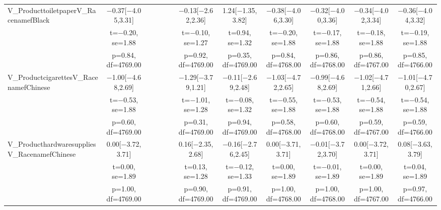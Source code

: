 \documentclass[]{report}
\begin{document}
\begin{table}
{\begin{tabular}[t]{lccccccccccc}
		V\_ProducttoiletpaperV\_RacenamefBlack & \num{-0.37}[\num{-4.05},\num{3.31}] &  &  &  &  & \num{-0.13}[\num{-2.62},\num{2.36}] & \num{1.24}[\num{-1.35},\num{3.82}] & \num{-0.38}[\num{-4.06},\num{3.30}] & \num{-0.32}[\num{-4.00},\num{3.36}] & \num{-0.34}[\num{-4.02},\num{3.34}] & \num{-0.36}[\num{-4.04},\num{3.32}]\\
		& t=\num{-0.20}, se=\num{1.88} &  &  &  &  & t=\num{-0.10}, se=\num{1.27} & t=\num{0.94}, se=\num{1.32} & t=\num{-0.20}, se=\num{1.88} & t=\num{-0.17}, se=\num{1.88} & t=\num{-0.18}, se=\num{1.88} & t=\num{-0.19}, se=\num{1.88}\\
		& p=\num{0.84}, df=\num{4769.00} &  &  &  &  & p=\num{0.92}, df=\num{4769.00} & p=\num{0.35}, df=\num{4769.00} & p=\num{0.84}, df=\num{4768.00} & p=\num{0.86}, df=\num{4768.00} & p=\num{0.86}, df=\num{4767.00} & p=\num{0.85}, df=\num{4766.00}\\
		V\_ProductcigarettesV\_RacenamefChinese & \num{-1.00}[\num{-4.68},\num{2.69}] &  &  &  &  & \num{-1.29}[\num{-3.79},\num{1.21}] & \num{-0.11}[\num{-2.69},\num{2.48}] & \num{-1.03}[\num{-4.72},\num{2.65}] & \num{-0.99}[\num{-4.68},\num{2.69}] & \num{-1.02}[\num{-4.71},\num{2.66}] & \num{-1.01}[\num{-4.70},\num{2.67}]\\
		& t=\num{-0.53}, se=\num{1.88} &  &  &  &  & t=\num{-1.01}, se=\num{1.28} & t=\num{-0.08}, se=\num{1.32} & t=\num{-0.55}, se=\num{1.88} & t=\num{-0.53}, se=\num{1.88} & t=\num{-0.54}, se=\num{1.88} & t=\num{-0.54}, se=\num{1.88}\\
		& p=\num{0.60}, df=\num{4769.00} &  &  &  &  & p=\num{0.31}, df=\num{4769.00} & p=\num{0.94}, df=\num{4769.00} & p=\num{0.58}, df=\num{4768.00} & p=\num{0.60}, df=\num{4768.00} & p=\num{0.59}, df=\num{4767.00} & p=\num{0.59}, df=\num{4766.00}\\
		V\_ProducthardwaresuppliesV\_RacenamefChinese & \num{0.00}[\num{-3.72},\num{3.71}] &  &  &  &  & \num{0.16}[\num{-2.35},\num{2.68}] & \num{-0.16}[\num{-2.76},\num{2.45}] & \num{0.00}[\num{-3.71},\num{3.71}] & \num{-0.01}[\num{-3.72},\num{3.70}] & \num{0.00}[\num{-3.72},\num{3.71}] & \num{0.08}[\num{-3.63},\num{3.79}]\\
		& t=\num{0.00}, se=\num{1.89} &  &  &  &  & t=\num{0.13}, se=\num{1.28} & t=\num{-0.12}, se=\num{1.33} & t=\num{0.00}, se=\num{1.89} & t=\num{-0.01}, se=\num{1.89} & t=\num{0.00}, se=\num{1.89} & t=\num{0.04}, se=\num{1.89}\\
		& p=\num{1.00}, df=\num{4769.00} &  &  &  &  & p=\num{0.90}, df=\num{4769.00} & p=\num{0.91}, df=\num{4769.00} & p=\num{1.00}, df=\num{4768.00} & p=\num{1.00}, df=\num{4768.00} & p=\num{1.00}, df=\num{4767.00} & p=\num{0.97}, df=\num{4766.00}\\

\end{tabular}}
\end{table}
\end{document}
